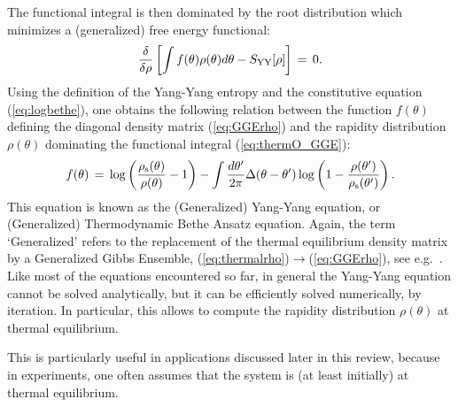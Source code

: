 \documentclass[onecolumn,amsfonts,showpacs,superscriptaddress]{revtex4-1}
\begin{document}
The functional integral is then dominated by the root distribution which minimizes a (generalized) free energy functional:
\begin{equation}
    \frac{\delta}{\delta \rho} \left[ \int f(\theta) \rho(\theta) d\theta  - S_{\rm YY}[\rho] \right] \, = \, 0.
\end{equation}
Using the definition of the Yang-Yang entropy and the constitutive equation (\ref{eq:logbethe}), one obtains the following relation between the function $f(\theta)$ defining the diagonal density matrix (\ref{eq:GGErho}) and the rapidity distribution $\rho(\theta)$ dominating the functional integral (\ref{eq:thermO_GGE}):
\begin{equation}
    \label{eq:yangyang}
   f(\theta) \, =  \, \log \left( \frac{\rho_{\rm s}(\theta)}{\rho(\theta)} -1 \right) - \int \frac{d\theta'}{2\pi} \Delta (\theta- \theta')   \log \left( 1 - \frac{\rho(\theta')}{\rho_{\rm s} (\theta')} \right).
\end{equation}
This equation is known as the (Generalized) Yang-Yang equation, or (Generalized) Thermodynamic Bethe Ansatz equation. Again, the term `Generalized' refers to the replacement of the thermal equilibrium density matrix by a Generalized Gibbs Ensemble, (\ref{eq:thermalrho})$\rightarrow$(\ref{eq:GGErho}), see e.g.~\citep{caux2012constructing,wouters2014quenching}. Like most of the equations encountered so far, in general the Yang-Yang equation cannot be solved analytically, but it can be efficiently solved numerically, by iteration. In particular, this allows to compute the rapidity distribution $\rho(\theta)$ at thermal equilibrium.

This is particularly useful in applications discussed later in this review, because in experiments, one often assumes that the system is (at least initially) at thermal equilibrium. 
\end{document}
